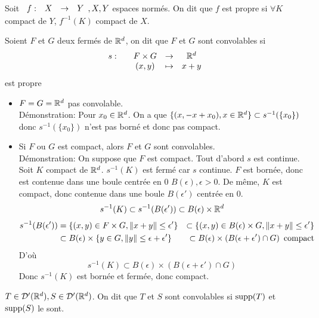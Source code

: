 \documentclass[]{report}
\begin{document}
    \begin{ra}{}{}
        Soit $\begin{array}{ccccc} f : & X & \to & Y \end{array},X,Y$ espaces normés. On dit que $f$ est propre si $\forall K$ compact de $Y$, $f^{-1}(K)$ compact de $X$.
    \end{ra}

    \begin{df}{}{}
        Soient $F$ et $G$ deux fermés de $\mathbb{R}^d$, on dit que $F$ et $G$ sont convolables si
        \[\begin{array}{ccccc} s : & & F\times G & \to & \mathbb{R}^d \\ & & (x,y) & \mapsto & x+y \end{array}\]
        est propre
    \end{df}

    \begin{ex}{}{}
        \begin{itemize}
            \item $F=G=\mathbb{R}^d$ pas convolable.\\
            Démonstration: Pour $x_0\in \mathbb{R}^d$. On a que $\{(x,-x+x_0),x\in \mathbb{R}^d\}\subset s^{-1}(\{x_0\})$ donc $s^{-1}(\{x_0\})$ n'est pas borné et donc pas compact.
            \item Si $F$ ou $G$ est compact, alors $F$ et $G$ sont convolables. \\
            Démonstration: On suppose que $F$ est compact. Tout d'abord $s$ est continue. Soit $K$ compact de $\mathbb{R}^d$. $s^{-1}(K)$ est fermé car $s$ continue. $F$ est bornée, donc est contenue dans une boule centrée en $0$ $B(\epsilon),\epsilon>0$. De même, $K$ est compact, donc contenue dans une boule $B(\epsilon')$ centrée en $0$.\\
            \[s^{-1}(K)\subset s^{-1}(B(\epsilon'))\subset B(\epsilon)\times \mathbb{R}^d\]
            \begin{align*}
                s^{-1}(B(\epsilon'))&=\{(x,y)\in F\times G,\lVert x+y \rVert\le \epsilon'\}&\subset\{(x,y)\in B(\epsilon)\times G,\lVert x+y \rVert\le \epsilon'\}\\
                &\subset B(\epsilon)\times \{y\in G,\lVert y \rVert\le \epsilon+\epsilon'\}&\subset B(\epsilon )\times \left( B(\epsilon +\epsilon' ) \cap G \right) \text{ compact}
            \end{align*}
            D'où
            \[s^{-1}(K)\subset B(\epsilon)\times\left(B(\epsilon+\epsilon')\cap G\right)\]
            Donc $s^{-1}(K)$ est bornée et fermée, donc compact.
        \end{itemize}
    \end{ex}

    \begin{df}{}{}
        $T\in \mathcal{D}'(\mathbb{R}^d),S\in \mathcal{D}'(\mathbb{R}^d)$. On dit que $T$ et $S$ sont convolables si $\text{supp}(T)$ et $\text{supp}(S)$ le sont.
    \end{df}
\end{document}
